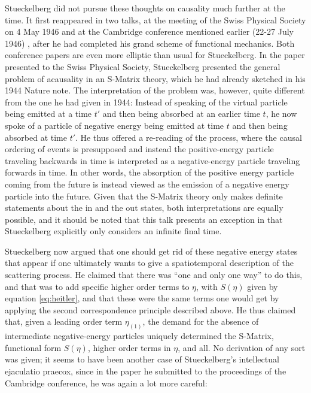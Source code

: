 \documentclass[12pt]{article}
\begin{document}
Stueckelberg did not pursue these thoughts on causality much further at the time. It first reappeared  in two talks, at the meeting of the Swiss Physical Society on 4 May 1946 \citep{stueckelberg_1946_une-propriete} and at the Cambridge conference mentioned earlier (22-27 July 1946) \citep{stueckelberg_1947_the-present}, after he had completed his grand scheme of functional mechanics. Both conference papers are even more elliptic than usual for Stueckelberg. In the paper presented to the Swiss Physical Society, Stueckelberg presented the general problem of acausality in an S-Matrix theory, which he had already sketched in his 1944 Nature note. The interpretation of the problem was, however, quite different from the one he had given in 1944: Instead of speaking of the virtual particle being emitted at a time $t'$ and then being absorbed at an earlier time $t$, he now spoke of a particle of negative energy being emitted at time $t$ and then being absorbed at time $t'$. He thus offered a re-reading of the process, where the causal ordering of events is presupposed and instead the positive-energy particle traveling backwards in time is interpreted as a negative-energy particle traveling forwards in time. In other words, the absorption of the positive energy particle coming from the future is instead viewed as the emission of a negative energy particle into the future. Given that the S-Matrix theory only makes definite statements about the in and the out states, both interpretations are equally possible, and it should be noted that this talk presents an exception in that Stueckelberg explicitly only considers an infinite final time.

Stueckelberg now argued that one should get rid of these negative energy states that appear if one ultimately wants to give a spatiotemporal description of the scattering process. He claimed that there was ``one and only one way'' to do this, and that was to add specific higher order terms to $\eta$, with $S(\eta)$ given by equation \ref{eq:heitler}, and that these were the same terms one would get by applying the second correspondence principle described above. He thus claimed that, given a leading order term $\eta_{(1)}$, the demand for the absence of intermediate negative-energy particles uniquely determined the S-Matrix, functional form $S(\eta)$, higher order terms in $\eta$, and all. No derivation of any sort was given; it seems to have been another case of Stueckelberg's intellectual ejaculatio praecox, since in the paper he submitted to the proceedings of the Cambridge conference, he was again a lot more careful:
\end{document}
